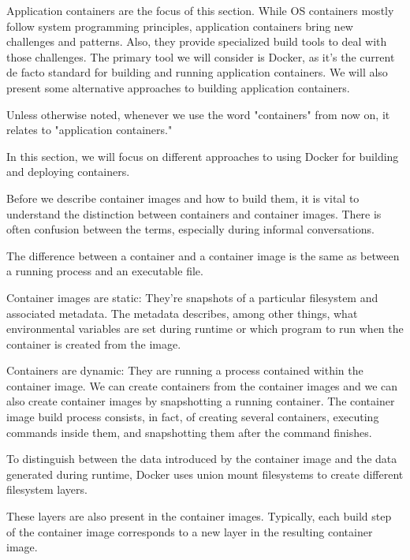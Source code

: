 
Application containers are the focus of this section. While OS containers mostly follow system programming principles, application containers bring new challenges and patterns. Also, they provide specialized build tools to deal with those challenges. The primary tool we will consider is Docker, as it's the current de facto standard for building and running application containers. We will also present some alternative approaches to building application containers.

Unless otherwise noted, whenever we use the word "containers" from now on, it relates to "application containers."

In this section, we will focus on different approaches to using Docker for building and deploying containers.


Before we describe container images and how to build them, it is vital to understand the distinction between containers and container images. There is often confusion between the terms, especially during informal conversations.

The difference between a container and a container image is the same as between a running process and an executable file.

Container images are static: They're snapshots of a particular filesystem and associated metadata. The metadata describes, among other things, what environmental variables are set during runtime or which program to run when the container is created from the image. 

Containers are dynamic: They are running a process contained within the container image. We can create containers from the container images and we can also create container images by snapshotting a running container. The container image build process consists, in fact, of creating several containers, executing commands inside them, and snapshotting them after the command finishes.

To distinguish between the data introduced by the container image and the data generated during runtime, Docker uses union mount filesystems to create different filesystem layers.

These layers are also present in the container images. Typically, each build step of the container image corresponds to a new layer in the resulting container image.


